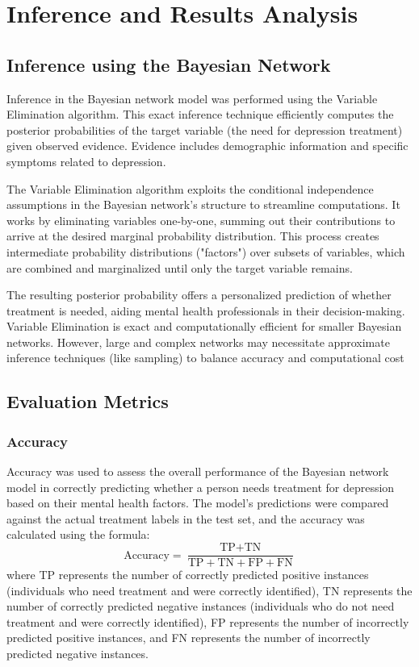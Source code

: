 \documentclass[conference]{IEEEtran}
\begin{document}
\section{Inference and Results Analysis}

\subsection{Inference using the Bayesian Network}

Inference in the Bayesian network model was performed using the Variable Elimination algorithm. This exact inference technique efficiently computes the posterior probabilities of the target variable (the need for depression treatment) given observed evidence.  Evidence includes demographic information and specific symptoms related to depression.

The Variable Elimination algorithm exploits the conditional independence assumptions in the Bayesian network's structure to streamline computations. It works by eliminating variables one-by-one, summing out their contributions to arrive at the desired marginal probability distribution. This process creates intermediate probability distributions ("factors") over subsets of variables, which are combined and marginalized until only the target variable remains.

The resulting posterior probability offers a personalized prediction of whether treatment is needed, aiding mental health professionals in their decision-making. Variable Elimination is exact and computationally efficient for smaller Bayesian networks.  However, large and complex networks may necessitate approximate inference techniques (like sampling) to balance accuracy and computational cost

\subsection{Evaluation Metrics}

\subsubsection{Accuracy}
Accuracy was used to assess the overall performance of the Bayesian network model in correctly predicting whether a person needs treatment for depression based on their mental health factors. The model's predictions were compared against the actual treatment labels in the test set, and the accuracy was calculated using the formula:
\begin{equation}
\text{Accuracy} = \frac{\text{TP} + \text{TN}}{\text{TP} + \text{TN} + \text{FP} + \text{FN}}
\end{equation}
where TP represents the number of correctly predicted positive instances (individuals who need treatment and were correctly identified), TN represents the number of correctly predicted negative instances (individuals who do not need treatment and were correctly identified), FP represents the number of incorrectly predicted positive instances, and FN represents the number of incorrectly predicted negative instances.
\end{document}
